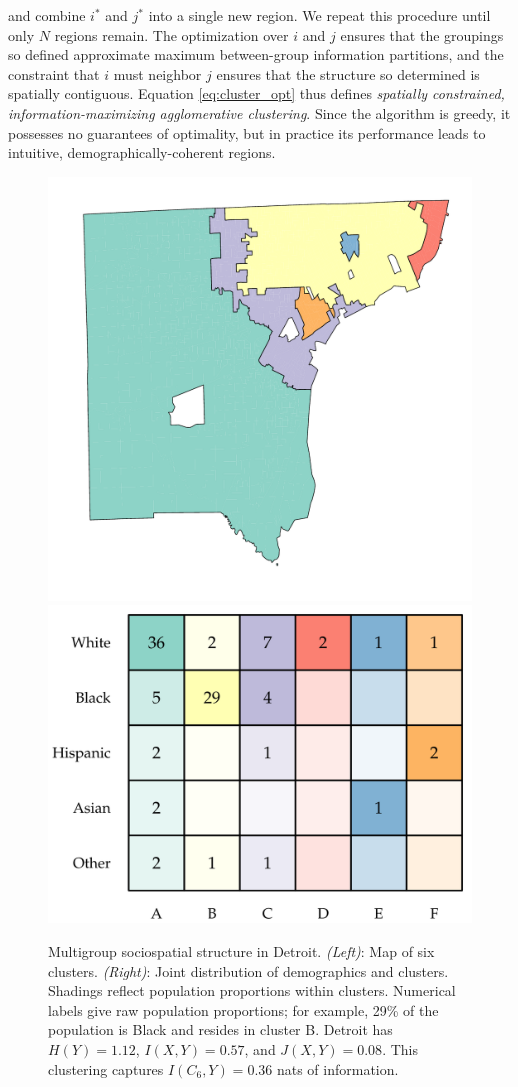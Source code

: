 \documentclass[9pt,twocolumn,twoside]{pnas-new}
\begin{document}
	and combine $i^*$ and $j^*$ into a single new region. We repeat this procedure until only $N$ regions remain. The optimization over $i$ and $j$ ensures that the groupings so defined approximate maximum between-group information partitions, and the constraint that $i$ must neighbor $j$ ensures that the structure so determined is spatially contiguous. Equation \eqref{eq:cluster_opt} thus defines \emph{spatially constrained, information-maximizing agglomerative clustering}. Since the algorithm is greedy, it possesses no guarantees of optimality, but in practice its performance leads to intuitive, demographically-coherent regions. 
	

	\begin{figure}
		\centering
			\includegraphics[width = .4\linewidth]{figs/example_cluster_map.pdf}
			\includegraphics[width = .4\linewidth]{figs/example_clusters_detailed.pdf}
			\caption{
				Multigroup sociospatial structure in Detroit. 
				\emph{(Left)}: Map of six clusters. 
				\emph{(Right)}: Joint distribution of demographics and clusters. 
				Shadings reflect population proportions within clusters. 
				Numerical labels give raw population proportions; for example, 29\% of the population is Black and resides in cluster B. 
				Detroit has $H(Y) = 1.12$, $I(X,Y) = 0.57$, and $J(X,Y) = 0.08$. 
				This clustering captures $I(C_6,Y) = 0.36$ nats of information.
			} \label{fig:detroit}
	\end{figure}
\end{document}
